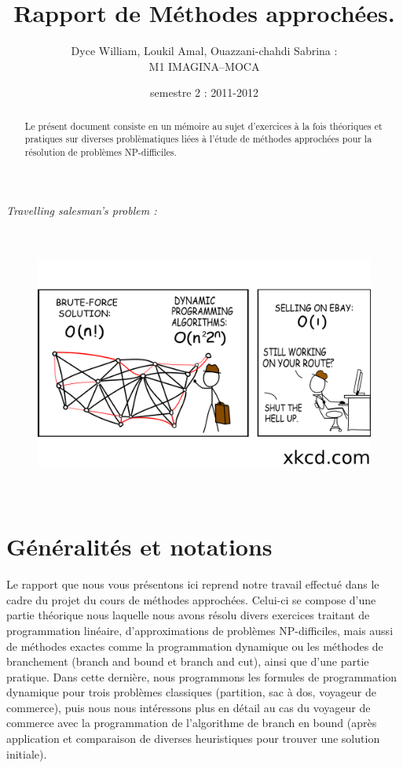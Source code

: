 \documentclass[a4paper, 12pt]{article}
\title{Rapport de Méthodes approchées.}
\author{Dyce William, Loukil Amal, Ouazzani-chahdi Sabrina : \\ M1 IMAGINA--MOCA}
\date{semestre 2 : 2011-2012}
\begin{document}
 

\maketitle

\begin{abstract}
  Le présent document consiste en un mémoire au sujet
  d'exercices à la fois théoriques et pratiques sur diverses
  problèmatiques liées à l'étude de méthodes approchées pour la
  résolution de problèmes NP-difficiles. 
\end{abstract}
\vspace{2cm}
\textit{Travelling salesman's problem :}
\begin{figure}[h!]
\centering
\includegraphics[height = 9cm]{commerce.png}
\end{figure}


\pagebreak

\tableofcontents

\pagebreak

\listoffigures

\listoftables
\pagebreak

\section{Généralités et notations}

Le rapport que nous vous présentons ici reprend notre travail effectué
dans le cadre du projet du cours de méthodes approchées. Celui-ci se
compose d'une partie théorique nous laquelle nous avons résolu divers
exercices traitant de programmation linéaire, d'approximations de
problèmes NP-difficiles, mais aussi de méthodes exactes comme la
programmation dynamique ou les méthodes de branchement (branch and
bound et branch and cut), ainsi que d'une partie pratique. Dans cette
dernière, nous programmons les formules de programmation dynamique
pour trois problèmes classiques (partition, sac à dos, voyageur de
commerce), puis nous nous intéressons plus en détail au cas du
voyageur de commerce avec la programmation de l'algorithme de branch
en bound (après application et comparaison de diverses heuristiques
pour trouver une solution initiale).
\end{document}
